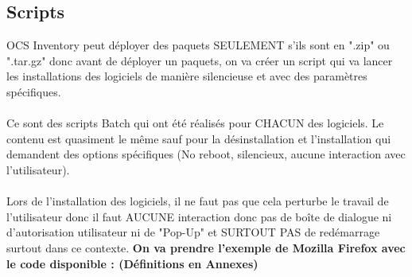 \documentclass[11pt,a4paper,oneside]{article}
\begin{document}
\subsection{Scripts}

OCS Inventory peut déployer des paquets SEULEMENT s'ils sont en ".zip" ou ".tar.gz" donc avant de déployer un paquets, on va créer un script qui va lancer les installations des logiciels de manière silencieuse et avec des paramètres spécifiques.
\\ \\
Ce sont des scripts Batch qui ont été réalisés pour CHACUN des logiciels. Le contenu est quasiment le même sauf pour la désinstallation et l'installation qui demandent des options spécifiques (No reboot, silencieux, aucune interaction avec l'utilisateur).
\\ \\
Lors de l'installation des logiciels, il ne faut pas que cela perturbe le travail de l'utilisateur donc il faut AUCUNE interaction donc pas de boîte de dialogue ni d'autorisation utilisateur ni de "Pop-Up" et SURTOUT PAS de redémarrage surtout dans ce contexte.
\newpage
\textbf{On va prendre l'exemple de Mozilla Firefox avec le code disponible : (Définitions en Annexes)}
\\
\end{document}
